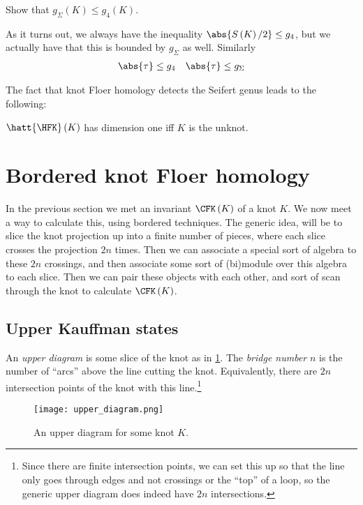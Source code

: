 \documentclass{amsproc}
\begin{document}
\begin{exr}
\begin{enumerate}
Show that $g_\Sigma\left( K \right) \leq g_4\left( K \right)$.
\end{enumerate}
\end{exr}

As it turns out, we always have the inequality $\abs{S\left( K \right)/2} \leq g_4$, 
but we actually have that this is bounded by $g_\Sigma$ as well.
Similarly
\begin{align}
\abs{\tau} \leq g_4
&&
\abs{\tau} \leq g_\Sigma
\end{align}

The fact that knot Floer homology detects the Seifert genus leads to the following:

\begin{cor}
$\hatt{\HFK}\left( K \right)$ has dimension one iff $K$ is the unknot.
\end{cor}

\section{Bordered knot Floer homology}

In the previous section we met an invariant $\CFK\left( K \right)$ of a knot $K$.
We now meet a way to calculate this, using bordered techniques.
The generic idea, will be to slice the knot projection up into a finite number of pieces, where
each slice crosses the projection $2n$ times. Then we can associate a special sort of algebra
to these $2n$ crossings, and then associate some sort of (bi)module over this algebra to each slice.
Then we can pair these objects with each other, and sort of scan through the knot
to calculate $\CFK\left( K \right)$.

\subsection{Upper Kauffman states}

An \emph{upper diagram} is some slice of the knot as in \cref{fig:upper_diagram}.
The \emph{bridge number} $n$ is the number of ``arcs'' above the line cutting the knot.
Equivalently, there are $2n$ intersection points of the knot with this line.\footnote{
Since there are finite intersection points, we can set this up so that the line
only goes through edges and not crossings or the ``top'' of a loop, so the generic 
upper diagram does indeed have $2n$ intersections.}

\begin{figure}
\texttt{[image: upper\_diagram.png]}
\caption{An upper diagram for some knot $K$.}
\label{fig:upper_diagram}
\end{figure}
\end{document}
